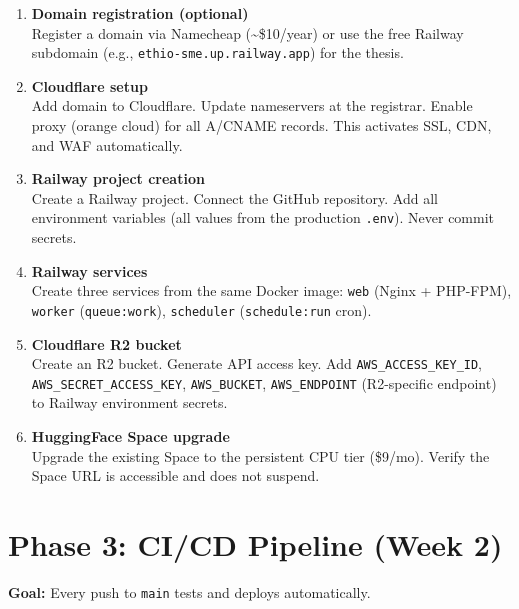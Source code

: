 \documentclass[12pt,a4paper]{report}
\begin{document}
\begin{enumerate}[leftmargin=1.5em, label=\textbf{\arabic*.}, start=7]

    \item \textbf{Domain registration (optional)} \\
    Register a domain via Namecheap (\textasciitilde\$10/year) or use
    the free Railway subdomain (e.g., \texttt{ethio-sme.up.railway.app})
    for the thesis.

    \item \textbf{Cloudflare setup} \\
    Add domain to Cloudflare. Update nameservers at the registrar.
    Enable proxy (orange cloud) for all A/CNAME records. This activates
    SSL, CDN, and WAF automatically.

    \item \textbf{Railway project creation} \\
    Create a Railway project. Connect the GitHub repository. Add all
    environment variables (all values from the production \texttt{.env}).
    Never commit secrets.

    \item \textbf{Railway services} \\
    Create three services from the same Docker image:
    \texttt{web} (Nginx + PHP-FPM), \texttt{worker}
    (\texttt{queue:work}), \texttt{scheduler}
    (\texttt{schedule:run} cron).

    \item \textbf{Cloudflare R2 bucket} \\
    Create an R2 bucket. Generate API access key. Add
    \texttt{AWS\_ACCESS\_KEY\_ID}, \texttt{AWS\_SECRET\_ACCESS\_KEY},
    \texttt{AWS\_BUCKET}, \texttt{AWS\_ENDPOINT} (R2-specific endpoint)
    to Railway environment secrets.

    \item \textbf{HuggingFace Space upgrade} \\
    Upgrade the existing Space to the persistent CPU tier (\$9/mo).
    Verify the Space URL is accessible and does not suspend.

\end{enumerate}

\section{Phase 3: CI/CD Pipeline (Week 2)}

\textbf{Goal:} Every push to \texttt{main} tests and deploys automatically.
\end{document}

